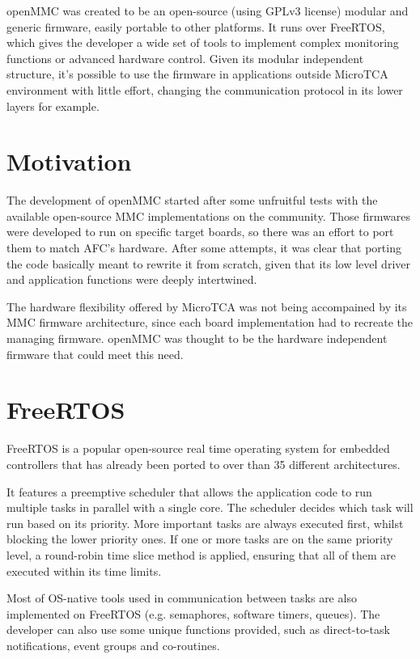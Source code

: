 \documentclass[a4paper,
              ]{jacow}
\begin{document}
openMMC was created to be an open-source (using GPLv3 license) modular and generic firmware, easily portable to other platforms. It runs over FreeRTOS, which gives the developer a wide set of tools to implement complex monitoring functions or advanced hardware control.
Given its modular independent structure, it's possible to use the firmware in applications outside MicroTCA environment with little effort, changing the communication protocol in its lower layers for example.

\section{Motivation}
The development of openMMC started after some unfruitful tests with the available open-source MMC implementations on the community.
Those firmwares were developed to run on specific target boards, so there was an effort to port them to match AFC's hardware.
After some attempts, it was clear that porting the code basically meant to rewrite it from scratch, given that its low level driver and application functions were deeply intertwined.

The hardware flexibility offered by MicroTCA was not being accompained by its MMC firmware architecture, since each board implementation had to recreate the managing firmware. openMMC was thought to be the hardware independent firmware that could meet this need.

\section{FreeRTOS}
FreeRTOS is a popular open-source real time operating system for embedded controllers that has already been ported to over than 35 different architectures.

It features a preemptive scheduler that allows the application code to run multiple tasks in parallel with a single core.
The scheduler decides which task will run based on its priority. More important tasks are always executed first, whilst blocking the lower priority ones.
If one or more tasks are on the same priority level, a round-robin time slice method is applied, ensuring that all of them are executed within its time limits.

Most of OS-native tools used in communication between tasks are also implemented on FreeRTOS (e.g. semaphores, software timers, queues).
The developer can also use some unique functions provided, such as direct-to-task notifications, event groups and co-routines.
\end{document}
